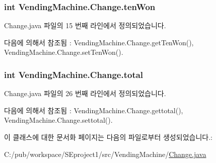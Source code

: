 \subsubsection[{\texorpdfstring{ten\+Won}{tenWon}}]{\setlength{\rightskip}{0pt plus 5cm}int Vending\+Machine.\+Change.\+ten\+Won\hspace{0.3cm}{\ttfamily [private]}}\hypertarget{class_vending_machine_1_1_change_a0c9fe365f26d478fc07e1bb9828cfcc7}{}\label{class_vending_machine_1_1_change_a0c9fe365f26d478fc07e1bb9828cfcc7}


Change.\+java 파일의 15 번째 라인에서 정의되었습니다.



다음에 의해서 참조됨 \+:  Vending\+Machine.\+Change.\+get\+Ten\+Won(), Vending\+Machine.\+Change.\+set\+Ten\+Won().

\subsubsection[{\texorpdfstring{total}{total}}]{\setlength{\rightskip}{0pt plus 5cm}int Vending\+Machine.\+Change.\+total\hspace{0.3cm}{\ttfamily [private]}}\hypertarget{class_vending_machine_1_1_change_aaa54155607801f52da0a520ef638e51d}{}\label{class_vending_machine_1_1_change_aaa54155607801f52da0a520ef638e51d}


Change.\+java 파일의 26 번째 라인에서 정의되었습니다.



다음에 의해서 참조됨 \+:  Vending\+Machine.\+Change.\+gettotal(), Vending\+Machine.\+Change.\+settotal().



이 클래스에 대한 문서화 페이지는 다음의 파일로부터 생성되었습니다.\+:\begin{DoxyCompactItemize}
\item 
C\+:/pub/workspace/\+S\+Eproject1/src/\+Vending\+Machine/\hyperlink{_change_8java}{Change.\+java}\end{DoxyCompactItemize}
